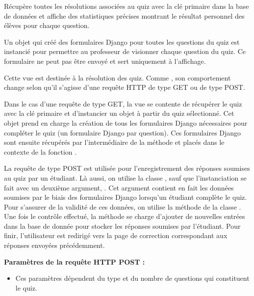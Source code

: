 \documentclass[a4,10pt,french]{sphinxmanual}
\begin{document}

\begin{fulllineitems}
\label{source:quiz.views.advanced_stats}
Récupère toutes les résolutions associées au quiz avec la clé primaire  dans la base de données et affiche
des statistiques précises montrant le résultat personnel des élèves pour chaque question.

Un objet  qui créé des formulaires Django pour toutes les questions
du quiz est instancié pour permettre au professeur de visionner 
chaque question du quiz. Ce formulaire ne peut pas être envoyé et sert
uniquement à l'affichage.

\end{fulllineitems}


\begin{fulllineitems}
\label{source:quiz.views.complete}
Cette vue est destinée à la résolution des quiz. Comme , son comportement
change selon qu'il s'agisse d'une requête HTTP de type GET ou de type POST.

Dans le cas d'une requête de type GET, la vue se contente de récupérer le quiz
avec la clé primaire  et d'instancier un objet  à partir
du quiz sélectionné. Cet objet prend en charge la création de tous les formulaires
Django nécessaires pour compléter le quiz (un formulaire Django par question).
Ces formulaires Django sont ensuite récupérés par l'intermédiaire de la méthode
 et placés dans le contexte de la fonction .

La requête de type POST est utilisée pour l'enregistrement des réponses soumises
au quiz par un étudiant. Là aussi, on utilise la classe , sauf que
l'instanciation se fait avec un deuxième argument, . Cet argument contient
en fait les données soumises par le biais des formulaires Django lorsqu'un
étudiant complète le quiz. Pour s'assurer de la validité de ces données, on
utilise la méthode  de la classe . Une fois le
contrôle effectué, la méthode  se charge d'ajouter de nouvelles
entrées dans la base de donnée pour stocker les réponses soumises par l'étudiant.
Pour finir, l'utilisateur est redirigé vers la page de correction correspondant
aux réponses envoyées précédemment.

\textbf{Paramètres de la requête HTTP POST :}
\begin{itemize}
\item {} 
Ces paramètres dépendent du type et du nombre de questions qui constituent le quiz.

\end{itemize}

\end{fulllineitems}
\end{document}
